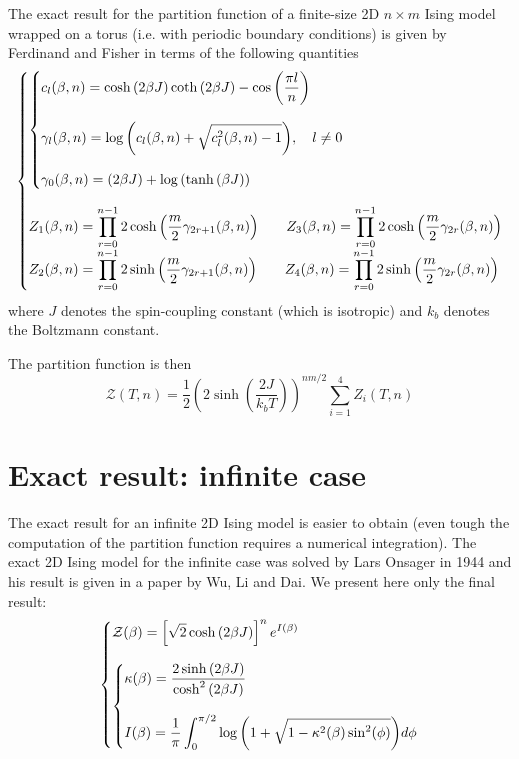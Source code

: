 \documentclass[11pt]{article}
\makeatletter
\newenvironment{system}
		{\left\lbrace\begin{array}{@{}l@{}}}
		{\end{array}\right.}
\makeatother
\begin{document}
The exact result for the partition function of a finite-size 2D $n \times m$ Ising model wrapped on a torus (i.e. with periodic boundary conditions) is given by Ferdinand and Fisher in terms of the following quantities
\[
\begin{system}
	\begin{system}
		\displaystyle	
		c_l(\beta,n) =	
					\cosh{(2\beta J)}\coth{(2\beta J)} -
					\cos{\left(\frac{\pi l}{n}\right)} 								\\
		\\
		\displaystyle
		\gamma_l(\beta,n) = 
					\log{\left(c_l(\beta,n) +
					\sqrt{c_l^2(\beta,n) - 1}\right)}, \quad l \neq 0	\\
		\\
		\displaystyle
		\gamma_0(\beta,n) = (2\beta J) + \log{(\tanh{(\beta J)})}
	\end{system}\\
	\\
\displaystyle 
	Z_1(\beta,n) = \prod_{r=0}^{n-1}
				2\cosh{\left(\frac{m}{2}\gamma_{2r+1}(\beta,n)\right)} 	\qquad
	Z_3(\beta,n) = \prod_{r=0}^{n-1}
				2\cosh{\left(\frac{m}{2}\gamma_{2r}(\beta,n)\right)} 	\\
\displaystyle
	Z_2(\beta,n) = \prod_{r=0}^{n-1}
				2\sinh{\left(\frac{m}{2}\gamma_{2r+1}(\beta,n)\right)}	\qquad
	Z_4(\beta,n) = \prod_{r=0}^{n-1}
				2\sinh{\left(\frac{m}{2}\gamma_{2r}(\beta,n)\right)}	\\
\end{system}
\]
where $J$ denotes the spin-coupling constant (which is isotropic) and $k_b$ denotes the Boltzmann constant.

The partition function is then
\[
\mathcal Z(T,n) = \frac{1}{2}\left(2\sinh{\left(\frac{2J}{k_bT}\right)}\right)^{nm/2}
					\sum_{i=1}^4 Z_i(T,n)
\]

\section{Exact result: infinite case}
\label{app:exact_infinite}

The exact result for an infinite 2D Ising model is easier to obtain (even tough the computation of the partition function requires a numerical integration). The exact 2D Ising model for the infinite case was solved by Lars Onsager in 1944 and his result is given in a paper by Wu, Li and Dai\cite{bib:exact2}. We present here only the final result:
\[
\begin{system}
\displaystyle \mathcal Z(\beta) = 
			\left[\sqrt{2}\cosh{(2\beta J)}\right]^n e^{I(\beta)} 				\\
\\
\begin{system}
	\displaystyle \kappa(\beta) = 
					\frac{2\sinh{(2\beta J)}}{\cosh^2{(2\beta J)}}			\\
	\\
	\displaystyle I(\beta) = 	
					\frac{1}{\pi}\int_0^{\pi/2}
					\log{\left(1 + \sqrt{1 - \kappa^2(\beta)\sin^2(\phi)}\right)}
					d\phi
	\end{system}
\end{system}
\]



\end{document}
